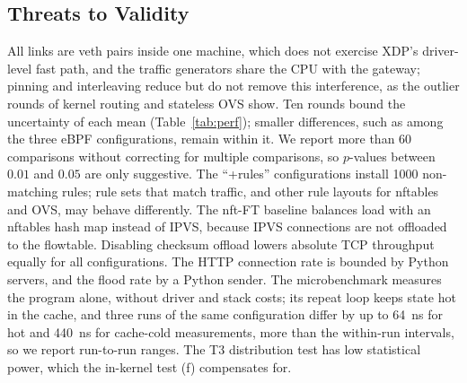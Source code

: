 \documentclass[conference]{IEEEtran}
\begin{document}
\subsection{Threats to Validity}
\label{sec:threats}
All links are veth pairs inside one machine, which does not exercise XDP's
driver-level fast path, and the traffic generators share the CPU with the
gateway; pinning and interleaving reduce but do not remove this
interference, as the outlier rounds of kernel routing and stateless OVS show.
Ten rounds bound the uncertainty of each mean (Table~\ref{tab:perf}); smaller
differences, such as among the three eBPF configurations, remain within it.
We report more than 60 comparisons without correcting for multiple
comparisons, so $p$-values between $0.01$ and $0.05$ are only suggestive.
The ``+rules'' configurations install 1000 non-matching rules; rule sets that
match traffic, and other rule layouts for nftables and OVS, may behave
differently. The nft-FT baseline balances load with an nftables hash map
instead of IPVS, because IPVS connections are not offloaded to the
flowtable. Disabling checksum offload lowers absolute TCP throughput equally
for all configurations. The HTTP connection rate is bounded by Python
servers, and the flood rate by a Python sender. The microbenchmark measures
the program alone, without driver and stack costs; its repeat loop keeps
state hot in the cache, and three runs of the same configuration differ by up
to 64~ns for hot and 440~ns for cache-cold measurements, more than the
within-run intervals, so we report run-to-run ranges. The T3 distribution test has low statistical
power, which the in-kernel test (f) compensates for.

\end{document}
